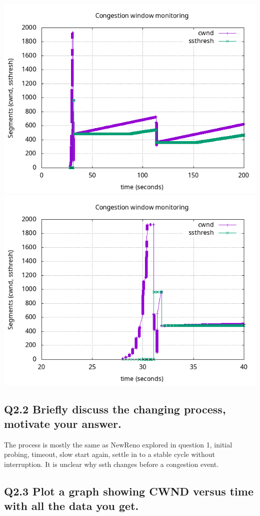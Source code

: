 \documentclass{article}
\begin{document}
\includegraphics[scale=0.5]{plots/lab1-group5-task2-question2.1.png}
\includegraphics[scale=0.5]{plots/lab1-group5-task2-question2.1-xrange-20-40.png}

\subsection{Q2.2 Briefly discuss the changing process, motivate your answer.}

The process is mostly the same as NewReno explored in question 1, initial probing, timeout, slow start again, settle in to a stable cycle without interruption. It is unclear why ssth changes before a congestion event.

\subsection{Q2.3 Plot a graph showing CWND versus time with all the data you get.}
\end{document}
